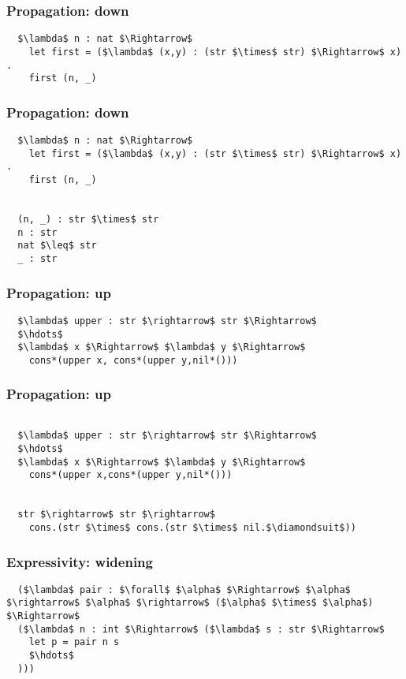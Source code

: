 \documentclass{beamer}
\begin{document}
\begin{frame}[fragile]
  \frametitle{Propagation: down}

  \begin{lstlisting}
  $\lambda$ n : nat $\Rightarrow$
    let first = ($\lambda$ (x,y) : (str $\times$ str) $\Rightarrow$ x) .
    first (n, _) 
  \end{lstlisting}

\end{frame}

\begin{frame}[fragile]
  \frametitle{Propagation: down}

  \begin{lstlisting}
  $\lambda$ n : nat $\Rightarrow$
    let first = ($\lambda$ (x,y) : (str $\times$ str) $\Rightarrow$ x) .
    first (n, _) 

    
  (n, _) : str $\times$ str
  n : str   
  nat $\leq$ str 
  _ : str  
  \end{lstlisting}

\end{frame}

\begin{frame}[fragile]
  \frametitle{Propagation: up}

  \begin{lstlisting}
  $\lambda$ upper : str $\rightarrow$ str $\Rightarrow$
  $\hdots$
  $\lambda$ x $\Rightarrow$ $\lambda$ y $\Rightarrow$
    cons*(upper x, cons*(upper y,nil*()))
  \end{lstlisting}

\end{frame}

\begin{frame}[fragile]
  \frametitle{Propagation: up}

  \begin{lstlisting}

  $\lambda$ upper : str $\rightarrow$ str $\Rightarrow$
  $\hdots$
  $\lambda$ x $\Rightarrow$ $\lambda$ y $\Rightarrow$
    cons*(upper x,cons*(upper y,nil*()))


  str $\rightarrow$ str $\rightarrow$
    cons.(str $\times$ cons.(str $\times$ nil.$\diamondsuit$))
  \end{lstlisting}

\end{frame}

\begin{frame}[fragile]
  \frametitle{Expressivity: widening}

  \begin{lstlisting}
  ($\lambda$ pair : $\forall$ $\alpha$ $\Rightarrow$ $\alpha$ $\rightarrow$ $\alpha$ $\rightarrow$ ($\alpha$ $\times$ $\alpha$) $\Rightarrow$ 
  ($\lambda$ n : int $\Rightarrow$ ($\lambda$ s : str $\Rightarrow$ 
    let p = pair n s
    $\hdots$
  )))

  \end{lstlisting}
\end{frame}
\end{document}
